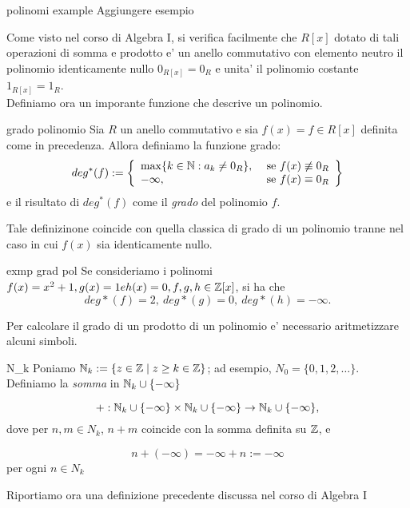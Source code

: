 \begin{example}[]{polinomi example}
Aggiungere esempio
\end{example}
Come visto nel corso di Algebra I, si verifica facilmente che $R[x]$ dotato di 
tali operazioni di somma e prodotto e' un anello commutativo con elemento neutro il polinomio
identicamente nullo $0_{R[x]} = 0_R$ e unita' il polinomio costante $1_{R[x]} = 1_R$.\\
Definiamo ora un imporante funzione che descrive un polinomio.

\newpage
\begin{defn}{grado polinomio}
Sia $R$ un anello commutativo e sia $f(x) = f \in R[x]$ definita come in precedenza. Allora definiamo
la funzione grado:
\begin{equation}
  deg^*(f) := \left\{\begin{array}{lr}
      \max\{k \in \mathbb{N} : a_k \neq 0_R\}, & \text{ se } f(x) \not\equiv 0_R\\
      -\infty, & \text{ se } f(x) \equiv 0_R 
      \end{array}\right\} 
\end{equation}
e il risultato di $deg^*(f)$ come il \emph{grado} del polinomio $f$.
\end{defn}
Tale definizinone coincide con quella classica di grado di un polinomio tranne
nel caso in cui $f(x)$ sia identicamente nullo. 

\begin{example}{exmp grad pol}
Se consideriamo i polinomi $f(x) = x^2 + 1, g(x) = 1 e h(x) = 0, f,g,h \in \mathbb{Z}[x]$, si ha che
\[deg*(f) = 2,\ deg*(g) = 0,\ deg*(h) = -\infty.\]
\end{example}
Per calcolare il grado di un prodotto di un polinomio e' necessario aritmetizzare
alcuni simboli.

\begin{defn}{N_k}
Poniamo $\mathbb{N}_k := \{z \in \mathbb{Z} \mid z \geq k \in \mathbb{Z}\}$; ad esempio, $N_0 = \{0, 1, 2, \dots\}$.\\
Definiamo la \emph{somma} in $\mathbb{N}_k \cup \{-\infty\}$

\[+ : \mathbb{N}_k \cup \{-\infty\} \times \mathbb{N}_k \cup \{-\infty\} \to \mathbb{N}_k \cup \{-\infty\},\]
dove per $n, m \in N_k$, $n+m$ coincide con la somma definita su $\mathbb{Z}$, e

\begin{equation}\label{sum_N_k}
n + (-\infty) = -\infty + n := -\infty
\end{equation}
per ogni $n \in N_k$
\end{defn}
Riportiamo ora una definizione precedente discussa nel corso di Algebra I

